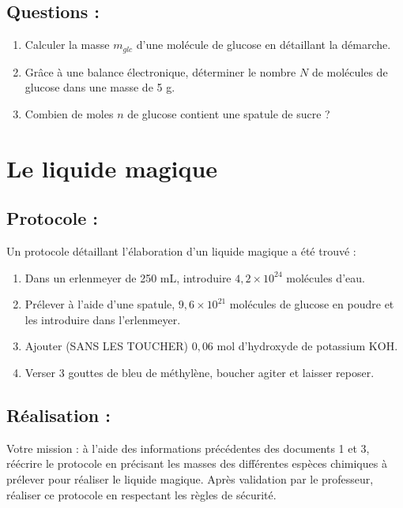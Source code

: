 \documentclass[a4paper,11pt,fleqn]{article}%
\begin{document}
	\subsection*{Questions : }
	\begin{enumerate}
		\item Calculer la masse $m_{glc}$ d'une molécule de glucose en détaillant la démarche.\\
		\item Grâce à une balance électronique, déterminer le nombre $N$ de molécules de glucose dans une masse de 5 g.\\
		\item Combien de moles $n$ de glucose contient une spatule de sucre ?\\
	\end{enumerate}
\section{Le liquide magique}
	\subsection*{Protocole :}
Un protocole détaillant l'élaboration d'un liquide magique a été trouvé :
\begin{enumerate}
	\item Dans un erlenmeyer de 250 mL, introduire $4,2 \times 10^{24}$ molécules d'eau.
	\item Prélever à l'aide d'une spatule, $9,6 \times 10^{21}$ molécules de glucose en poudre et les introduire dans l'erlenmeyer.
	\item Ajouter (SANS LES TOUCHER) $0,06$ mol d'hydroxyde de potassium KOH.
	\item Verser 3 gouttes de bleu de méthylène, boucher agiter et laisser reposer.
\end{enumerate}
	\subsection*{Réalisation :}
Votre mission : à l'aide des informations précédentes des documents 1 et 3, réécrire le protocole en précisant les masses des différentes espèces chimiques à prélever pour réaliser le liquide magique. Après validation par le professeur, réaliser ce protocole en respectant les règles de sécurité.\\
\end{document}
